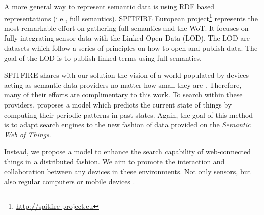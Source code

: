 A more general way to represent semantic data is using RDF based representations (i.e., full semantics).
SPITFIRE European project\footnote{\url{http://spitfire-project.eu}} represents the most remarkable effort on gathering full semantics and the WoT.
It focuses on fully integrating sensor data with the Linked Open Data (LOD). 
The LOD are datasets which follow a series of principles on how to open and publish data.
The goal of the LOD is to publish linked terms using full semantics.

SPITFIRE shares with our solution the vision of a world populated by devices acting as semantic data providers no matter how small they are \citep{hasemann_rdf_2012}.
Therefore, many of their efforts are complimentary to this work.
To search within these providers, \citet{pfisterer_spitfire:_2011} proposes a model which predicts the current state of things by computing their periodic patterns in past states.
Again, the goal of this method is to adapt search engines to the new fashion of data provided on the \emph{Semantic Web of Things}.

Instead, we propose a model to enhance the search capability of web-connected things in a distributed fashion.
We aim to promote the interaction and collaboration between any devices in these environments.
Not only sensors, but also regular computers or mobile devices \citep{balandin_access_2011}.